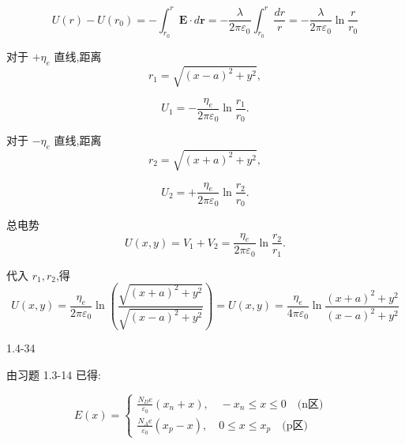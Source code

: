 \documentclass{article}
\begin{document}
$$U(r)-U(r_0)=-\int_{r_0}^r\mathbf{E}\cdot d\mathbf{r}=-\frac{\lambda}{2\pi\varepsilon_0}\int_{r_0}^r\frac{dr}{r}=-\frac{\lambda}{2\pi\varepsilon_0}\ln\frac{r}{r_0}$$

\vspace{1em}

\begin{minipage}[b]{0.46\linewidth}

对于 $+\eta_e$ 直线,距离  
$$r_1 = \sqrt{(x-a)^2 + y^2},$$
  
$$U_1 = -\frac{\eta_e}{2\pi\varepsilon_0} \ln\frac{r_1}{r_0}.$$
\end{minipage}
\hfill
\begin{minipage}[b]{0.46\linewidth}
对于 $-\eta_e$ 直线,距离  
$$r_2 = \sqrt{(x+a)^2 + y^2},$$

$$U_2 = +\frac{\eta_e}{2\pi\varepsilon_0} \ln\frac{r_2}{r_0}.$$
\end{minipage}

\vspace{1em}

总电势  
$$U(x,y) = V_1 + V_2 = \frac{\eta_e}{2\pi\varepsilon_0} \ln\frac{r_2}{r_1}.$$

代入 $r_1, r_2$,得  
$$U(x,y) = \frac{\eta_e}{2\pi\varepsilon_0} \ln\left( \frac{\sqrt{(x+a)^2 + y^2}}{\sqrt{(x-a)^2 + y^2}} \right)=U(x,y)=\frac{\eta_e}{4\pi\varepsilon_0}\ln\frac{\left(x+a\right)^2+y^2}{\left(x-a\right)^2+y^2}$$





\newpage

1.4-34





由习题 1.3-14 已得:

$$E(x)=\begin{cases}\frac{N_De}{\varepsilon_0}(x_n+x),\quad-x_n\leq x\leq0\quad\text{(n区)}\\\frac{N_Ae}{\varepsilon_0}(x_p-x),\quad0\leq x\leq x_p\quad\text{(p区)}&\end{cases}$$
\end{document}
